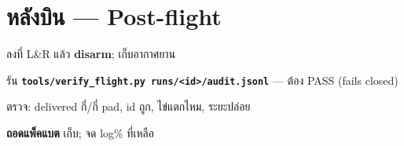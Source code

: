 \documentclass[11pt,a4paper]{article}
\newcommand{\code}[1]{\texttt{\small #1}}
\begin{document}
\section{หลังบิน — Post-flight}
\begin{cl}
\item ลงที่ L\&R แล้ว \textbf{disarm}; เก็บอากาศยาน
\item รัน \textbf{\code{tools/verify_flight.py runs/<id>/audit.jsonl}} — ต้อง PASS (fails closed)
\item ตรวจ: delivered กี่/กี่ pad, id ถูก, ไข่แตกไหม, ระยะปล่อย
\item \textbf{ถอดแพ็คแบต} เก็บ; จด log\% ที่เหลือ
\end{cl}

\end{document}
